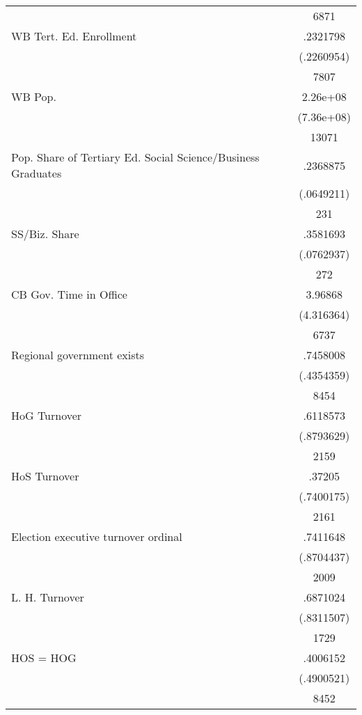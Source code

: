 {\begin{longtable}{l*{1}{c}}
                    &        6871\\
WB Tert. Ed. Enrollment&    .2321798\\
                    &  (.2260954)\\
                    &        7807\\
WB Pop.             &    2.26e+08\\
                    &  (7.36e+08)\\
                    &       13071\\
Pop. Share of Tertiary Ed. Social Science/Business Graduates&    .2368875\\
                    &  (.0649211)\\
                    &         231\\
SS/Biz. Share       &    .3581693\\
                    &  (.0762937)\\
                    &         272\\
CB Gov. Time in Office&     3.96868\\
                    &  (4.316364)\\
                    &        6737\\
Regional government exists   &    .7458008\\
                    &  (.4354359)\\
                    &        8454\\
HoG Turnover        &    .6118573\\
                    &  (.8793629)\\
                    &        2159\\
HoS Turnover        &      .37205\\
                    &  (.7400175)\\
                    &        2161\\
Election executive turnover ordinal&    .7411648\\
                    &  (.8704437)\\
                    &        2009\\
L. H. Turnover      &    .6871024\\
                    &  (.8311507)\\
                    &        1729\\
HOS = HOG           &    .4006152\\
                    &  (.4900521)\\
                    &        8452\\

\end{longtable}}
